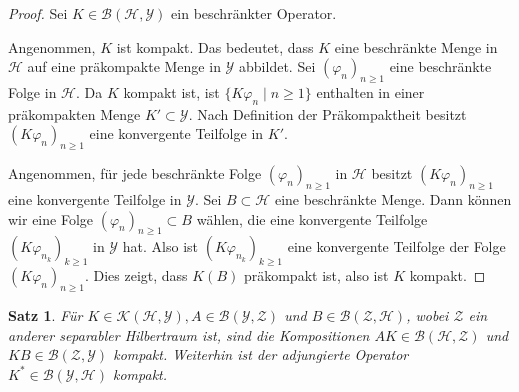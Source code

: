 \documentclass[11pt, hidelinks]{article}
\newcommand{\h}{\mathcal{H}}
\numberwithin{conj}{section}
\newtheorem{theorem}[conj]{Satz}
\begin{document}
\begin{proof}
Sei $K \in \mathcal{B}(\h,\mathcal{Y})$ ein beschränkter Operator.

Angenommen, $K$ ist kompakt. Das bedeutet, dass $K$ eine beschränkte Menge in $\h$ auf eine präkompakte Menge in $\mathcal{Y}$ abbildet. Sei $(\varphi_n)_{n \geq 1}$ eine beschränkte Folge in $\h$. Da $K$ kompakt ist, ist $\{K\varphi_n \; \vert \; n \geq 1\}$ enthalten in einer präkompakten Menge $K' \subset \mathcal{Y}$. Nach Definition der Präkompaktheit besitzt $(K\varphi_n)_{n \geq 1}$ eine konvergente Teilfolge in $K'$.

Angenommen, für jede beschränkte Folge $(\varphi_n)_{n \geq 1}$ in $\h$ besitzt $(K\varphi_n)_{n \geq 1}$ eine konvergente Teilfolge in $\mathcal{Y}$. Sei $B \subset \h$ eine beschränkte Menge. Dann können wir eine Folge $(\varphi_n)_{n \geq 1} \subset B$ wählen, die eine konvergente Teilfolge $(K\varphi_{n_k})_{k \geq 1}$ in $\mathcal{Y}$ hat. Also ist $(K\varphi_{n_k})_{k \geq 1}$ eine konvergente Teilfolge der Folge $(K\varphi_{n})_{n \geq 1}$. Dies zeigt, dass $K(B)$ präkompakt ist, also ist $K$ kompakt.
\end{proof}

\begin{theorem}
    \label{schauder}
    Für $K \in \mathcal{K}(\h,\mathcal{Y}), A \in \mathcal{B}(\mathcal{Y},\mathcal{Z})$ und $B \in \mathcal{B}(\mathcal{Z},\h)$, wobei $\mathcal{Z}$ ein anderer separabler Hilbertraum ist, sind die Kompositionen $AK \in \mathcal{B}(\h,\mathcal{Z})$ und $KB \in \mathcal{B}(\mathcal{Z},\mathcal{Y})$ kompakt. Weiterhin ist der adjungierte Operator $K^\ast \in \mathcal{B}(\mathcal{Y},\h)$ kompakt.
\end{theorem}
\end{document}
